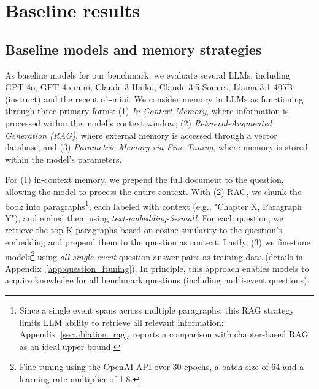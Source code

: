 \documentclass{article}
\newcommand{\AH}[1]{\textcolor{cyan}{#1}}
\begin{document}
\section{Baseline results}\label{sec:baselines}

\subsection{Baseline models and memory strategies}

As baseline models for our benchmark, we evaluate several LLMs, including GPT-4o, GPT-4o-mini, Claude 3 Haiku, Claude 3.5 Sonnet, Llama 3.1 405B (instruct) and the recent o1-mini. We consider memory in LLMs as functioning through three primary forms: (1) \emph{In-Context Memory}, where information is processed within the model's context window; (2) \emph{Retrieval-Augmented Generation (RAG)}, where external memory is accessed through a vector database; and (3) \emph{Parametric Memory via Fine-Tuning}, where memory is stored within the model's parameters. 

For (1) in-context memory, we prepend the full document to the question, allowing the model to process the entire context. With (2) RAG, we chunk the book into paragraphs\footnote{Since a single event spans across multiple paragraphs, this RAG strategy limits LLM ability to retrieve all relevant information: Appendix~\ref{sec:ablation_rag}, reports a comparison with chapter-based RAG as an ideal upper bound.}, each labeled with context (e.g., "Chapter X, Paragraph Y"), and embed them using \textit{text-embedding-3-small}. For each question, we retrieve the top-K paragraphs based on cosine similarity to the question's embedding and prepend them to the question as context. 
Lastly, (3) we fine-tune models\footnote{Fine-tuning using the OpenAI API over 30 epochs, a batch size of 64 and a learning rate multiplier of 1.8.} using \emph{all single-event} question-answer pairs as training data (details in Appendix~\ref{app:question_ftuning}). %
In principle, this approach enables models to acquire knowledge for all benchmark questions (including multi-event questions).
\end{document}
